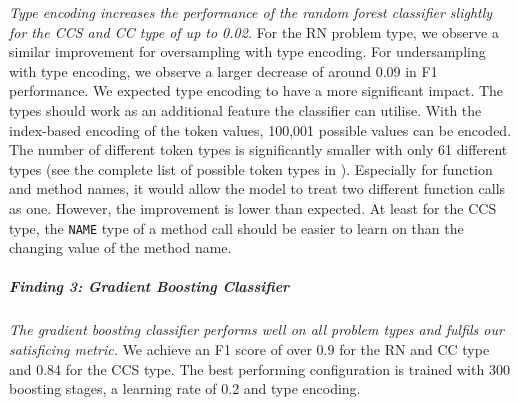 \textit{Type encoding increases the performance of the random forest classifier slightly for the CCS and CC type of up to 0.02.} For the RN problem type, we observe a similar improvement for oversampling with type encoding. For undersampling with type encoding, we observe a larger decrease of around 0.09 in F1 performance. 
We expected type encoding to have a more significant impact. The types should work as an additional feature the classifier can utilise. With the index-based encoding of the token values, 100,001 possible values can be encoded. The number of different token types is significantly smaller with only 61 different types (see the complete list of possible token types in ). Especially for function and method names, it would allow the model to treat two different function calls as one. 
However, the improvement is lower than expected. At least for the CCS type, the \texttt{NAME} type of a method call should be easier to learn on than the changing value of the method name.  

\begin{center}
\end{center}

\subparagraph{Finding 3: Gradient Boosting Classifier}\label{finding:rq2_gbc}
\textit{The gradient boosting classifier performs well on all problem types and fulfils our satisficing metric.} We achieve an F1 score of over 0.9 for the RN and CC type and 0.84 for the CCS type. The best performing configuration is trained with 300 boosting stages, a learning rate of 0.2 and type encoding.


